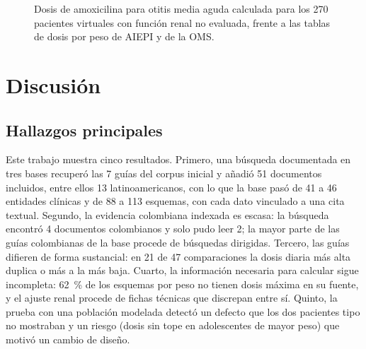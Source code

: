 \documentclass[11pt,a4paper]{article}
\begin{document}
\begin{figure}[htbp]
\centering
{}
\caption{Dosis de amoxicilina para otitis media aguda calculada para los 270 pacientes virtuales con función renal no evaluada, frente a las tablas de dosis por peso de AIEPI y de la OMS.}
\label{fig:amox}
\end{figure}

\section{Discusión}

\subsection{Hallazgos principales}

Este trabajo muestra cinco resultados. Primero, una búsqueda documentada en tres bases recuperó las 7 guías del corpus inicial y añadió 51 documentos incluidos, entre ellos 13 latinoamericanos, con lo que la base pasó de 41 a 46 entidades clínicas y de 88 a 113 esquemas, con cada dato vinculado a una cita textual. Segundo, la evidencia colombiana indexada es escasa: la búsqueda encontró 4 documentos colombianos y solo pudo leer 2; la mayor parte de las guías colombianas de la base procede de búsquedas dirigidas. Tercero, las guías difieren de forma sustancial: en 21 de 47 comparaciones la dosis diaria más alta duplica o más a la más baja. Cuarto, la información necesaria para calcular sigue incompleta: 62~\% de los esquemas por peso no tienen dosis máxima en su fuente, y el ajuste renal procede de fichas técnicas que discrepan entre sí. Quinto, la prueba con una población modelada detectó un defecto que los dos pacientes tipo no mostraban y un riesgo (dosis sin tope en adolescentes de mayor peso) que motivó un cambio de diseño.
\end{document}
